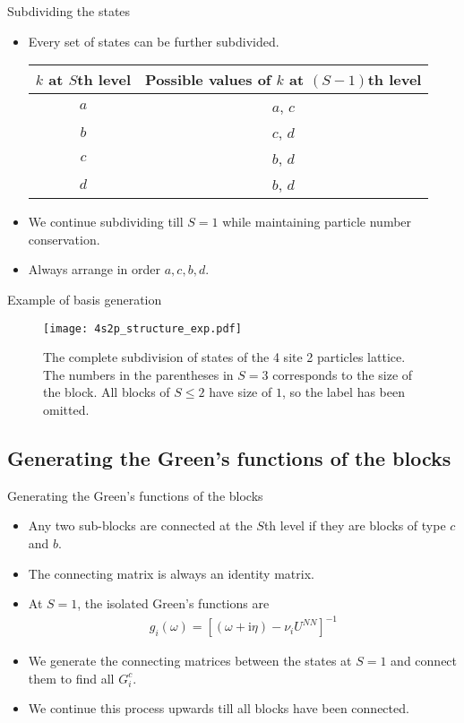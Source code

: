 \documentclass[usenames,dvipsnames]{beamer}
\newcommand{\I}{\mathrm{i}}
\begin{document}
\begin{frame}{Subdividing the states}
	\begin{itemize}
		\item {
			Every set of states can be further subdivided.
			\begin{table}[h!]
				\centering
				\begin{tabular}{cc}
					\toprule
					$ k $ at $ S $th level & Possible values of $ k $ at $ (S-1) $th level\\
					\midrule
					$ a $ & $ a $, $ c $\\
					$ b $ & $ c $, $ d $\\
					$ c $ & $ b $, $ d $\\
					$ d $ & $ b $, $ d $\\
					\bottomrule
				\end{tabular}
			\end{table}
			}
		\item {
			We continue subdividing till $ S = 1 $ while maintaining particle number conservation.
			}
		\item Always arrange in order $ a, c, b, d $.
	\end{itemize}
\end{frame}

\begin{frame}{Example of basis generation}
	\begin{figure}[h!]
		\centering
		\texttt{[image: 4s2p\_structure\_exp.pdf]}
		\caption{The complete subdivision of states of the 4 site 2 particles lattice. The numbers in the parentheses in $ S=3 $ corresponds to the size of the block. All blocks of $ S \le 2 $ have size of $ 1 $, so the label has been omitted.}
		\label{fig:4s2p_structure}
	\end{figure}
\end{frame}

\subsection{Generating the Green's functions of the blocks}
\begin{frame}{Generating the Green's functions of the blocks}
	\begin{itemize}
		\item {
			Any two sub-blocks are connected at the $ S $th level if they are blocks of type $ c $ and $ b $.
			}
		\item {
			The connecting matrix is always an identity matrix.
			}
		\item {
			At $ S = 1 $, the isolated Green's functions are
			\begin{align}\label{eqn:gf-s1}
			g_i\left(\omega\right) = \left[ \left( \omega + \I \eta\right) - \nu_i U^{NN} \right]^{-1}
			\end{align}
			}
		\item {
			We generate the connecting matrices between the states at $ S = 1 $ and connect them to find all $ G^{c}_i $. 
			}
		\item {
			We continue this process upwards till all blocks have been connected.
			}
	\end{itemize}
\end{frame}
\end{document}
